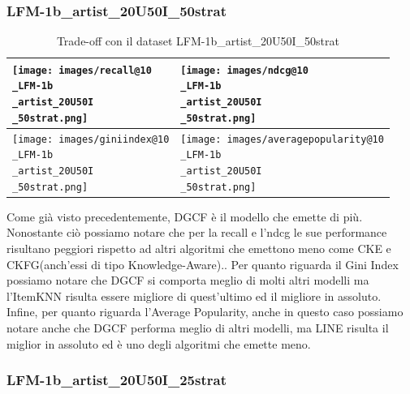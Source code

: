 \subsubsection{LFM-1b\_artist\_20U50I\_50strat}


\begin{table}[H]
    \centering
    \footnotesize
    \setlength\tabcolsep{0pt}
    \begin{tabularx}{\textwidth}{|X|X|}
        \hline
        \texttt{[image: images/recall@10\\\_LFM-1b\\\_artist\_20U50I\\\_50strat.png]} &
        \texttt{[image: images/ndcg@10\\\_LFM-1b\\\_artist\_20U50I\\\_50strat.png]} \\
        \hline
        \texttt{[image: images/giniindex@10\\\_LFM-1b\\\_artist\_20U50I\\\_50strat.png]} &
        \texttt{[image: images/averagepopularity@10\\\_LFM-1b\\\_artist\_20U50I\\\_50strat.png]} \\
        \hline
    \end{tabularx}
    \caption{Trade-off con il dataset LFM-1b\_artist\_20U50I\_50strat}
    \label{tab:emissions_info}
\end{table}


\noindent Come già visto precedentemente, DGCF è il modello che emette di più. Nonostante ciò possiamo notare che per la recall e l'ndcg le sue performance risultano peggiori rispetto ad altri algoritmi che emettono meno come CKE e CKFG(anch'essi di tipo Knowledge-Aware)..
Per quanto riguarda il Gini Index possiamo notare che DGCF si comporta meglio di molti altri modelli ma l'ItemKNN risulta essere migliore di quest'ultimo ed il migliore in assoluto.
Infine, per quanto riguarda l'Average Popularity, anche in questo caso possiamo notare anche che DGCF performa meglio di altri modelli, ma LINE risulta il miglior in assoluto ed è uno degli algoritmi che emette meno.



\subsubsection{LFM-1b\_artist\_20U50I\_25strat}


